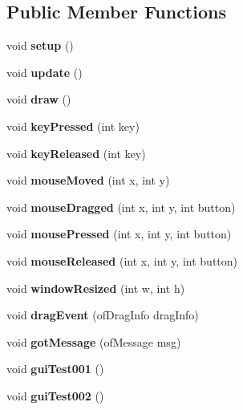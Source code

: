 \subsection*{Public Member Functions}
\begin{DoxyCompactItemize}
\item 
\mbox{\label{classof_app_af68eaa1366244f7a541cd08e02199c12}} 
void {\bfseries setup} ()
\item 
\mbox{\label{classof_app_afef41ea4aee5a22ea530afba33ae7a7b}} 
void {\bfseries update} ()
\item 
\mbox{\label{classof_app_a75dd45437b9e317db73d8daef1ad49f8}} 
void {\bfseries draw} ()
\item 
\mbox{\label{classof_app_a957d3197364bbac8e67eaa4f15b28ad3}} 
void {\bfseries key\+Pressed} (int key)
\item 
\mbox{\label{classof_app_aa1503a87453bcfdd395fe4acca5d91a0}} 
void {\bfseries key\+Released} (int key)
\item 
\mbox{\label{classof_app_a158b41a606310db4633fdb817b21047c}} 
void {\bfseries mouse\+Moved} (int x, int y)
\item 
\mbox{\label{classof_app_a1ec53d1be799dc275806ff6c6548cd83}} 
void {\bfseries mouse\+Dragged} (int x, int y, int button)
\item 
\mbox{\label{classof_app_a2c2ea9c160231e55424dfd98466ef27d}} 
void {\bfseries mouse\+Pressed} (int x, int y, int button)
\item 
\mbox{\label{classof_app_aa3131f1554fc49eaa9ee0f284e48129b}} 
void {\bfseries mouse\+Released} (int x, int y, int button)
\item 
\mbox{\label{classof_app_ae4dc1ec1513dcbe48bc78a5e4c3fac0f}} 
void {\bfseries window\+Resized} (int w, int h)
\item 
\mbox{\label{classof_app_aada5a79556321801567752a0e5a69bda}} 
void {\bfseries drag\+Event} (of\+Drag\+Info drag\+Info)
\item 
\mbox{\label{classof_app_a885672a72340a5e998af1d16718dc766}} 
void {\bfseries got\+Message} (of\+Message msg)
\item 
\mbox{\label{classof_app_a6ee1a7af6a715c6448f9769ff22cbabc}} 
void {\bfseries gui\+Test001} ()
\item 
\mbox{\label{classof_app_ad561e567741c5979497091b4ce6c1517}} 
void {\bfseries gui\+Test002} ()
\end{DoxyCompactItemize}


